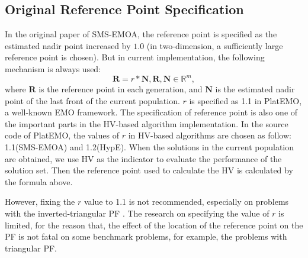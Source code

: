 \documentclass[conference]{IEEEtran}
\begin{document}
\subsection{Original Reference Point Specification}
In the original paper of SMS-EMOA\cite{smsemoa}, 
the reference point is specified as the estimated nadir point increased by $\boldsymbol{1.0}$
(in two-dimension, a sufficiently large reference point is chosen). 
But in current implementation, the following mechanism is always used:
\begin{equation}\label{frpa1}
  \boldsymbol R = r * \boldsymbol N, 
  \boldsymbol R, \boldsymbol N \in \mathbb{R}^m, 
\end{equation}
where $\boldsymbol R$ is the reference point in each generation, 
and $\boldsymbol N$ is the estimated nadir point of the last front of the current population. 
$r$ is specified as 1.1 in PlatEMO\cite{PlatEMO}, a well-known EMO framework. 
The specification of reference point is also one of the important parts in the HV-based algorithm implementation.
In the source code of PlatEMO, the values of $r$ in HV-based algorithms are chosen as follow: 
1.1(SMS-EMOA\cite{smsemoa}) and 1.2(HypE\cite{HypE}). %
When the solutions in the current population are obtained, 
we use HV as the indicator to evaluate the performance of the solution set. 
Then the reference point used to calculate the HV is calculated by the formula above. 

However, fixing the $r$ value to 1.1 is not recommended, especially on problems with the inverted-triangular PF
\cite{hisao:RPhowtoSpecify}. 
The research on specifying the value of $r$ is limited, for the reason that, 
the effect of the location of the reference point on the PF 
is not fatal on some benchmark problems, for example, the problems with triangular PF. 

%
\end{document}
